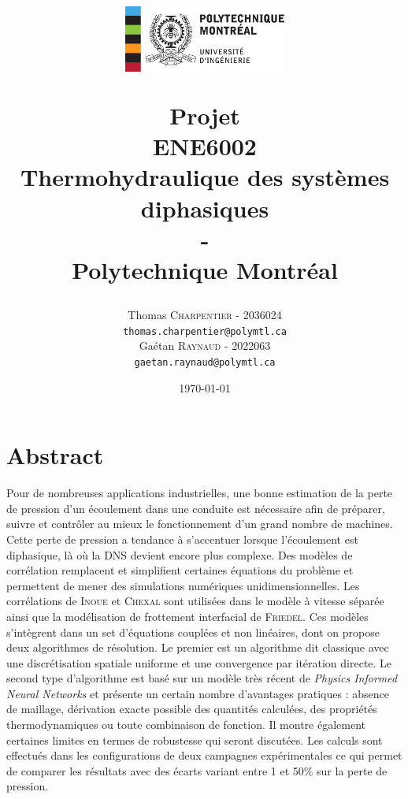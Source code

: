 \documentclass[12pt]{article}
\title{
\centerline{\includegraphics[width=0.4\textwidth]{images/poly}}
\vspace{0.5 cm}
Projet \\
\vspace{1cm}
ENE6002
\large  \\
Thermohydraulique des systèmes diphasiques \\ 
\Huge-\\
\normalsize Polytechnique Montréal
  }
\author{
    \begin{minipage}{.46\textwidth}
        \begin{center}
            Thomas \textsc{Charpentier} - 2036024\\
            \texttt{thomas.charpentier@polymtl.ca}
        \end{center}
    \end{minipage}%
    \hfill\vrule\hfill
    \begin{minipage}{0.46\textwidth}
        \begin{center}
            Gaétan \textsc{Raynaud} - 2022063\\
            \texttt{gaetan.raynaud@polymtl.ca}
        \end{center}
    \end{minipage}
}
\date{\today}
\begin{document}
\maketitle
\section*{Abstract}

Pour de nombreuses applications industrielles, une bonne estimation de la perte de pression d'un écoulement dans une conduite est nécessaire afin de préparer, suivre et contrôler au mieux le fonctionnement d'un grand nombre de machines. Cette perte de pression a tendance à s'accentuer lorsque l'écoulement est diphasique, là où la DNS devient encore plus complexe. Des modèles de corrélation remplacent et simplifient certaines équations du problème et permettent de mener des simulations numériques unidimensionnelles. Les corrélations de \textsc{Inoue} et \textsc{Chexal} sont utilisées dans le modèle à vitesse séparée ainsi que la modélisation de frottement interfacial de \textsc{Friedel}. Ces modèles s'intègrent dans un set d'équations couplées et non linéaires, dont on propose deux algorithmes de résolution. Le premier est un algorithme dit \og classique\fg{} avec une discrétisation spatiale uniforme et une convergence par itération directe. Le second type d'algorithme est basé sur un modèle très récent de \textit{Physics Informed Neural Networks} et présente un certain nombre d'avantages pratiques : absence de maillage, dérivation exacte possible des quantités calculées, des propriétés thermodynamiques ou toute combinaison de fonction. Il montre également certaines limites en termes de robustesse qui seront discutées. Les calculs sont effectués dans les configurations de deux campagnes expérimentales ce qui permet de comparer les résultats avec des écarts variant entre 1 et 50\% sur la perte de pression.

\newpage
\tableofcontents
\newpage

\newpage

\newpage

\newpage

\newpage

\newpage

\newpage

\newpage
%

\FloatBarrier
\newpage


\end{document}
